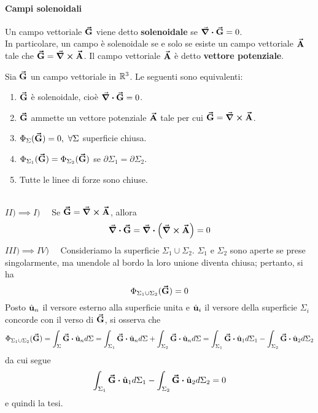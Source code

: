 \paragraph{Campi solenoidali}\label{CampoSolenoidale}
\begin{define}
	Un campo vettoriale $\vb*{\va{G}}$ viene detto \textbf{solenoidale} se $\div{\vb*{\va{G}}}=0$.\\
	In particolare, un campo è solenoidale se e solo se esiste un campo vettoriale $\vb*{\va{A}}$ tale che $\vb*{\va{G}}=\curl{\vb*{\va{A}}}$. Il campo vettoriale $\vb*{\va{A}}$ è detto \textbf{vettore potenziale}.
\end{define}
\begin{theorema}
	Sia $\vb*{\va{G}}$ un campo vettoriale in $\mathbb{R}^3$. Le seguenti sono equivalenti:
	\begin{enumerate}[label=\roman*)]
		\item $\vb*{\va{G}}$ è solenoidale, cioè $\div{\vb*{\va{G}}}=0$.
		\item $\vb*{\va{G}}$ ammette un vettore potenziale $\vb*{\va{A}}$ tale per cui $\vb*{\va{G}}=\curl{\vb*{\va{A}}}$.
		\item $\Phi_{\Sigma}(\vb*{\va{G}})=0,\ \forall \Sigma$ superficie chiusa.
		\item $\Phi_{\Sigma_1}(\vb*{\va{G}})=\Phi_{\Sigma_2}(\vb*{\va{G}})$ se $\partial\Sigma_1=\partial\Sigma_2$.
		\item Tutte le linee di forze sono chiuse.
	\end{enumerate}
\end{theorema}
\begin{demonstration}~\\ %
	$II)\implies I)\quad$ Se $\vb*{\va{G}}=\curl{\vb*{\va{A}}}$, allora
	\begin{equation*}
		\div{\vb*{\va{G}}}=\div{\left(\curl{\vb*{\va{A}}}\right)}=0
	\end{equation*}
	$III) \implies IV)\quad$ Consideriamo la superficie $\Sigma_1\cup\Sigma_2$. $\Sigma_1$ e $\Sigma_2$ sono aperte se prese singolarmente, ma unendole al bordo la loro unione diventa chiusa; pertanto, si ha
	\begin{equation*}
		\Phi_{\Sigma_1\cup\Sigma_2}(\vb*{\va{G}})=0
	\end{equation*}
	Posto $\hat{\mathbf{u}}_n$ il versore esterno alla superficie unita e $\hat{\mathbf{u}}_i$ il versore della superficie $\Sigma_i$ concorde con il verso di $\vb*{\va{G}}$, si osserva che
	\begin{equation*}
		\Phi_{\Sigma_1\cup\Sigma_2}(\vba{G})=\int_{\Sigma}\vba{G}\vdot\vbh{u}_nd\Sigma=\int_{\Sigma_1}\vba{G}\vdot\vbh{u}_nd\Sigma+\int_{\Sigma_2}\vba{G}\vdot\vbh{u}_nd\Sigma=\int_{\Sigma_1}\vba{G}\vdot\vbh{u}_1d\Sigma_1-\int_{\Sigma_2}\vba{G}\vdot\vbh{u}_2d\Sigma_2
	\end{equation*}
da cui segue
\begin{equation*}
	\int_{\Sigma_1}\vba{G}\vdot\vbh{u}_1d\Sigma_1-\int_{\Sigma_2}\vba{G}\vdot\vbh{u}_2d\Sigma_2=0
\end{equation*}
e quindi la tesi.
\end{demonstration}
